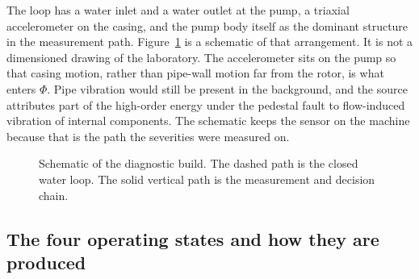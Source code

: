 The loop has a water inlet and a water outlet at the pump, a triaxial accelerometer on the casing, and the pump body itself as the dominant structure in the measurement path.
Figure~\ref{fig:rig} is a schematic of that arrangement.
It is not a dimensioned drawing of the laboratory.
The accelerometer sits on the pump so that casing motion, rather than pipe-wall motion far from the rotor, is what enters \(\Phi\).
Pipe vibration would still be present in the background, and the source attributes part of the high-order energy under the pedestal fault to flow-induced vibration of internal components.
The schematic keeps the sensor on the machine because that is the path the severities were measured on.

\begin{figure}[H]
\centering
{}
\caption{Schematic of the diagnostic build. The dashed path is the closed water loop. The solid vertical path is the measurement and decision chain.}
\label{fig:rig}
\end{figure}

\subsection{The four operating states and how they are produced}

